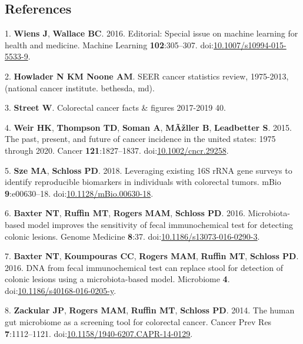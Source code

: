 \documentclass[11pt,]{article}
\begin{document}
\newpage

\subsection{References}\label{references}

\hypertarget{refs}{}
\hypertarget{ref-wiens_editorial:_2016}{}
1. \textbf{Wiens J}, \textbf{Wallace BC}. 2016. Editorial: Special issue
on machine learning for health and medicine. Machine Learning
\textbf{102}:305--307.
doi:\href{https://doi.org/10.1007/s10994-015-5533-9}{10.1007/s10994-015-5533-9}.

\hypertarget{ref-seer_2016}{}
2. \textbf{Howlader N KM \textnormal{Noone AM}}. SEER cancer statistics
review, 1975-2013, (national cancer institute. bethesda, md).

\hypertarget{ref-street_colorectal_nodate}{}
3. \textbf{Street W}. Colorectal cancer facts \& figures 2017-2019 40.

\hypertarget{ref-weir_past_2015}{}
4. \textbf{Weir HK}, \textbf{Thompson TD}, \textbf{Soman A},
\textbf{MÃžller B}, \textbf{Leadbetter S}. 2015. The past, present, and
future of cancer incidence in the united states: 1975 through 2020.
Cancer \textbf{121}:1827--1837.
doi:\href{https://doi.org/10.1002/cncr.29258}{10.1002/cncr.29258}.

\hypertarget{ref-sze_leveraging_2018}{}
5. \textbf{Sze MA}, \textbf{Schloss PD}. 2018. Leveraging existing 16S
rRNA gene surveys to identify reproducible biomarkers in individuals
with colorectal tumors. mBio \textbf{9}:e00630--18.
doi:\href{https://doi.org/10.1128/mBio.00630-18}{10.1128/mBio.00630-18}.

\hypertarget{ref-baxter_microbiota-based_2016}{}
6. \textbf{Baxter NT}, \textbf{Ruffin MT}, \textbf{Rogers MAM},
\textbf{Schloss PD}. 2016. Microbiota-based model improves the
sensitivity of fecal immunochemical test for detecting colonic lesions.
Genome Medicine \textbf{8}:37.
doi:\href{https://doi.org/10.1186/s13073-016-0290-3}{10.1186/s13073-016-0290-3}.

\hypertarget{ref-baxter_dna_2016}{}
7. \textbf{Baxter NT}, \textbf{Koumpouras CC}, \textbf{Rogers MAM},
\textbf{Ruffin MT}, \textbf{Schloss PD}. 2016. DNA from fecal
immunochemical test can replace stool for detection of colonic lesions
using a microbiota-based model. Microbiome \textbf{4}.
doi:\href{https://doi.org/10.1186/s40168-016-0205-y}{10.1186/s40168-016-0205-y}.

\hypertarget{ref-zackular_human_2014}{}
8. \textbf{Zackular JP}, \textbf{Rogers MAM}, \textbf{Ruffin MT},
\textbf{Schloss PD}. 2014. The human gut microbiome as a screening tool
for colorectal cancer. Cancer Prev Res \textbf{7}:1112--1121.
doi:\href{https://doi.org/10.1158/1940-6207.CAPR-14-0129}{10.1158/1940-6207.CAPR-14-0129}.
\end{document}
